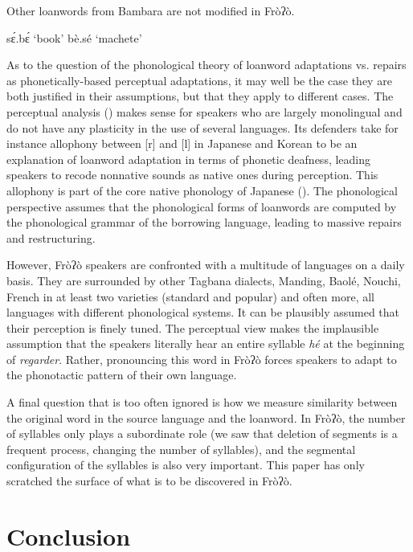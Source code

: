 \documentclass[output=paper]{langscibook}
\begin{document}
Other loanwords from Bambara are not modified in Fròʔò.      

\begin{exe}
    \begin{multicols}{2}\raggedcolumns
        \ex sɛ́.bɛ́ 
        \trans `book'
        \columnbreak\ex bè.sé 
        \trans `machete'
    \end{multicols}
\end{exe}

As to the question of the phonological theory of loanword adaptations vs. repairs as phonetically{}-based perceptual adaptations, it may well be the case they are both justified in their assumptions, but that they apply to different cases. The perceptual analysis (\citealt{Peperkamp2003}) makes sense for speakers who are largely monolingual and do not have any plasticity in the use of several languages. Its defenders take for instance allophony between [r] and [l] in Japanese and Korean to be an explanation of loanword adaptation in terms of phonetic deafness, leading speakers to recode nonnative sounds as native ones during perception. This allophony is part of the core native phonology of Japanese (\citealt{Ito1995}). The phonological perspective assumes that the phonological forms of loanwords are computed by the phonological grammar of the borrowing language, leading to massive repairs and restructuring. 

However, Fròʔò speakers are confronted with a multitude of languages on a daily basis. They are surrounded by other Tagbana dialects, Manding, Baolé, Nouchi, French in at least two varieties (standard and popular) and often more, all languages with different phonological systems. It can be plausibly assumed that their perception is finely tuned. The perceptual view makes the implausible assumption that the speakers literally hear an entire syllable \textit{hé} at the beginning of \textit{regarder}. Rather, pronouncing this word in Fròʔò forces speakers to adapt to the phonotactic pattern of their own language.

A final question that is too often ignored is how we measure similarity between the original word in the source language and the loanword. In Fròʔò, the number of syllables only plays a subordinate role (we saw that deletion of segments is a frequent process, changing the number of syllables), and the segmental configuration of the syllables is also very important. This paper has only scratched the surface of what is to be discovered in Fròʔò.

\section{Conclusion}
\label{sec:traore:conclusion:6}
\end{document}
